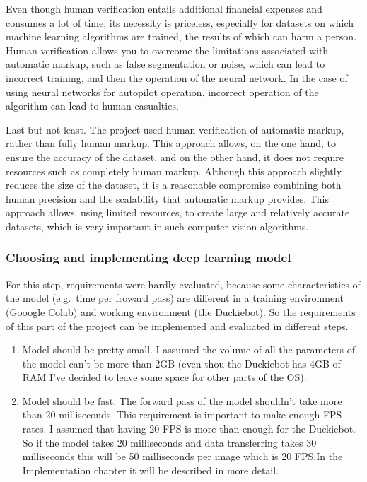 Even though human verification entails additional financial expenses and consumes a lot of time, its necessity is priceless, especially for
datasets on which machine learning algorithms are trained, the results of which can harm a person. Human verification allows you to overcome the limitations
associated with automatic markup, such as false segmentation or noise, which can lead to incorrect training, and then the operation of the neural network.
In the case of using neural networks for autopilot operation, incorrect operation of the algorithm can lead to human casualties.

Last but not least. The project used human verification of automatic markup, rather than fully human markup. This approach allows, on the one hand, 
to ensure the accuracy of the dataset, and on the other hand, it does not require resources such as completely human markup. Although this approach slightly
reduces the size of the dataset, it is a reasonable compromise combining both human precision and the scalability that automatic markup provides.
This approach allows, using limited resources, to create large and relatively accurate datasets, which is very important in such computer
vision algorithms.

\subsubsection{Choosing and implementing deep learning model}
For this step, requirements were hardly evaluated, because some characteristics of the model (e.g.\ time per froward pass) are different in a training environment 
(Gooogle Colab) and working environment (the Duckiebot). So the requirements of this part of the project can be implemented and evaluated in different steps.
\begin{enumerate}
    \item Model should be pretty small. I assumed the volume of all the parameters of the model can't be more than 2GB (even thou the Duckiebot has 4GB of RAM I've 
    decided to leave some space for other parts of the OS).
    \item Model should be fast. The forward pass of the model shouldn't take more than 20 milliseconds. This requirement is important to make enough FPS rates. 
    I assumed that having 20 FPS is more than enough for the Duckiebot. So if the model takes 20 milliseconds and data transferring takes 30 milliseconds this will 
    be 50 milliseconds per image which is 20 FPS.\@ In the Implementation chapter it will be described in more detail.
\end{enumerate}

